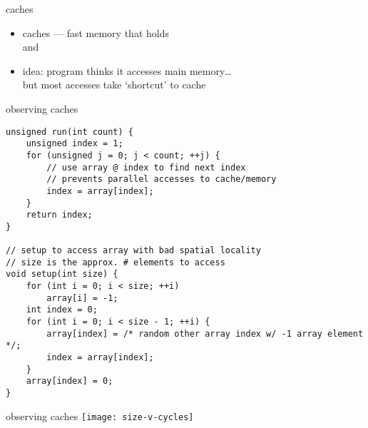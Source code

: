 \begin{frame}{caches}
    \begin{itemize}
    \item caches --- fast memory that holds\\
         and \\
    \item idea: program thinks it accesses main memory\ldots \\
        but most accesses take `shortcut' to cache
    \end{itemize} 
\end{frame}

\begin{frame}[fragile,label=observeCaches]{observing caches}
\lstset{
    language=C++,style=smaller
}
\begin{lstlisting}
unsigned run(int count) {
    unsigned index = 1;
    for (unsigned j = 0; j < count; ++j) {
        // use array @ index to find next index
        // prevents parallel accesses to cache/memory
        index = array[index];
    }
    return index;
}

// setup to access array with bad spatial locality
// size is the approx. # elements to access
void setup(int size) {
    for (int i = 0; i < size; ++i)
        array[i] = -1;
    int index = 0;
    for (int i = 0; i < size - 1; ++i) {
        array[index] = /* random other array index w/ -1 array element */;
        index = array[index];
    }
    array[index] = 0;
}
\end{lstlisting}
\end{frame}

\begin{frame}{observing caches}
    \vspace{-1cm}
    \texttt{[image: size-v-cycles]}
\end{frame} 
